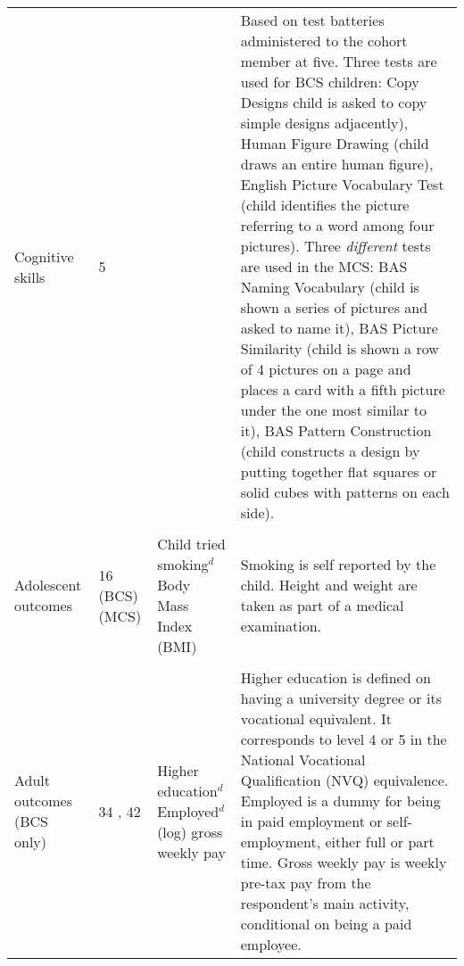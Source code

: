 \begin{landscape}
\begin{table}[ht!]
\begin{tabular}{L{.2\textwidth}C{.1\textwidth}L{.3\textwidth}L{.7\textwidth}}
Cognitive skills & 5 & & Based on test batteries administered to the cohort member at five. Three tests are used for BCS children: Copy Designs child is asked to copy simple designs adjacently), Human Figure Drawing (child draws an entire human figure), English Picture Vocabulary Test (child identifies the picture referring to a word among four pictures). Three \emph{different} tests are used in the MCS: BAS Naming Vocabulary (child is shown a series of pictures and asked to name it), BAS Picture Similarity (child is shown a row of 4 pictures on a page and places a card with a fifth picture under the one most similar to it), BAS Pattern Construction (child constructs a design by putting together flat squares or solid cubes with patterns on each side).

 \\ \\[-1.5em]
Adolescent outcomes & 16 (BCS)  (MCS) & Child tried smoking$^d$ \newline Body Mass Index (BMI) & Smoking is self reported by the child. Height and weight are taken as part of a medical examination. \\ \\[-1.5em]
Adult outcomes (BCS only) & 34  , 42 & Higher education$^d$ \newline Employed$^d$ \newline (log) gross weekly pay & Higher education is defined on having a university degree or its vocational equivalent. It corresponds to level 4 or 5 in the National Vocational Qualification (NVQ) equivalence. Employed is a dummy for being in paid employment or self-employment, either full or part time. Gross weekly pay is weekly pre-tax pay from the respondent's main activity, conditional on being a paid employee. \\
\bottomrule
\end{tabular}
\end{table}
\end{landscape}


